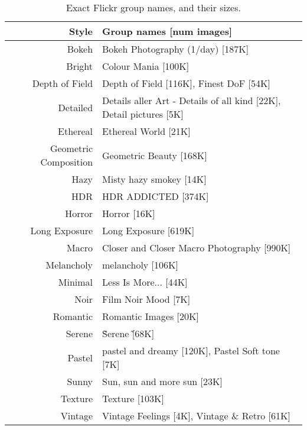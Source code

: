 \begin{table}
\centering
\caption{Exact Flickr group names, and their sizes.}\label{tab:flickr_groups}
\vspace{1em}
\begin{tabular}{rl}
    \textbf{Style}        & \textbf{Group names [num images]} \\
    \midrule
    Bokeh                 & Bokeh Photography (1/day) [187K] \\
    Bright                & Colour Mania [100K] \\
    Depth of Field        & Depth of Field [116K], Finest DoF [54K] \\
    Detailed              & Details aller Art - Details of all kind [22K], Detail pictures [5K] \\
    Ethereal              & Ethereal World [21K] \\
    Geometric Composition & Geometric Beauty [168K] \\
    Hazy                  & Misty hazy smokey [14K] \\
    HDR                   & HDR ADDICTED [374K]\\
    Horror                & Horror [16K] \\
    Long Exposure         & Long Exposure [619K] \\
    Macro                 & Closer and Closer Macro Photography [990K] \\
    Melancholy            & melancholy [106K] \\
    Minimal               & Less Is More... [44K] \\
    Noir                  & Film Noir Mood [7K] \\
    Romantic              & Romantic Images [20K] \\
    Serene                & \~ Serene \~ [68K] \\
    Pastel                & pastel and dreamy [120K], Pastel Soft tone [7K] \\
    Sunny                 & Sun, sun and more sun [23K] \\
    Texture               & Texture [103K] \\
    Vintage               & Vintage Feelings [4K], Vintage \& Retro [61K] \\
    \bottomrule
\end{tabular}
\end{table}
